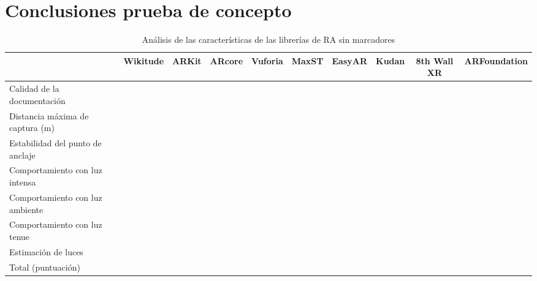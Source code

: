 \section{Conclusiones prueba de concepto}
\begin{table}[H]
\resizebox{\textwidth}{!} {
    \centering
    \begin{tabular}{m{3cm}|c|c|c|c|c|c|c|c|c}
    &Wikitude&	ARKit &	ARcore & Vuforia &	MaxST &	EasyAR & Kudan & 8th Wall XR & ARFoundation\\
     \hline
         Calidad de la documentación      &          &       &        &         &       &        &       &             &              \\
 \hline
 Distancia máxima de captura (m)  &          &       &        &         &       &        &       &             &              \\
  \hline
Estabilidad del punto de anclaje &          &       &        &         &       &        &       &             &              \\
 \hline
Comportamiento con luz intensa   &          &       &        &         &       &        &       &             &              \\
 \hline
Comportamiento con luz ambiente  &          &       &        &         &       &        &       &             &              \\
 \hline
Comportamiento con luz tenue     &          &       &        &         &       &        &       &             &              \\
 \hline
Estimación de luces              &          &       &        &         &       &        &       &             &              \\
 \hline
Total (puntuación)               &          &       &        &         &       &        &       &             &            
    \end{tabular}
}
    \caption{Análisis de las características de las librerías de RA sin marcadores}
    \label{tab:my_label}
\end{table}

\noindent
